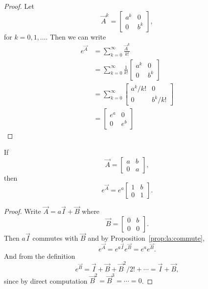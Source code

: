 \begin{proof}
	Let
	\begin{equation*}
		\vec A^k = 
		\begin{bmatrix}
			a^k & 0 \\
			0 & b^k
		\end{bmatrix},
	\end{equation*}
	for $k = 0, 1, \dotsc$. Then we can write
	\begin{align*}
		e^{\vec A} 	&= \sum_{k = 0}^\infty \frac{\vec A^k}{k!} \\
					&= \sum_{k = 0}^\infty \frac{1}{k!}
					\begin{bmatrix}
						a^k & 0 \\
						0 & b^k
					\end{bmatrix} \\
					&= \sum_{k = 0}^\infty
					\begin{bmatrix}
						a^k / k!	& 0 \\
						0 			& b^k / k!
					\end{bmatrix} \\
					&= 
					\begin{bmatrix}
						e^a & 0 \\
						0 & e^b
					\end{bmatrix}
	\end{align*}
\end{proof}

\begin{proposition} %
	\label{prop:la:degenerate}
	If
	\begin{equation*}
		\vec A =
		\begin{bmatrix}
			a & b \\
			0 & a
		\end{bmatrix},
	\end{equation*}
	then
	\begin{equation*}
		e^{\vec A} = e^a
		\begin{bmatrix}
			1 & b \\
			0 & 1
		\end{bmatrix}.
	\end{equation*}
\end{proposition}

\begin{proof}
	Write $\vec A = a \vec I + \vec B$ where
	\begin{equation*}
		\vec B =
		\begin{bmatrix}
			0 & b \\
			0 & 0
		\end{bmatrix}.
	\end{equation*}
	Then $a\vec I$ commutes with $\vec B$ and by Proposition~\ref{prop:la:commute},
	\begin{equation*}
		e^{\vec A} = e^{a \vec I}e^{\vec B} = e^{a}e^{\vec B}.
	\end{equation*}
	And from the definition
	\begin{equation*}
		e^{\vec B} = \vec I + \vec B + \vec B^2 / 2! + \cdots = \vec I + \vec B,
	\end{equation*}
	since by direct computation $\vec B^2 = \vec B^3 = \cdots = 0$.
\end{proof}

